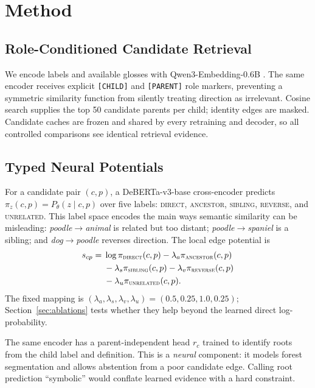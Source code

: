 \documentclass[11pt]{article}
\begin{document}
\section{Method}

\subsection{Role-Conditioned Candidate Retrieval}

We encode labels and available glosses with Qwen3-Embedding-0.6B
\citep{zhang2025qwen3embedding}.  The same encoder receives explicit
\texttt{[CHILD]} and \texttt{[PARENT]} role markers, preventing a symmetric
similarity function from silently treating direction as irrelevant.  Cosine
search supplies the top 50 candidate parents per child; identity edges are
masked.  Candidate caches are frozen and shared by every retraining and decoder, so
all controlled comparisons see identical retrieval evidence.

\subsection{Typed Neural Potentials}

For a candidate pair $(c,p)$, a DeBERTa-v3-base cross-encoder
\citep{he2021deberta} predicts $\pi_z(c,p)=P_\theta(z\mid c,p)$ over five
labels: \textsc{direct}, \textsc{ancestor}, \textsc{sibling},
\textsc{reverse}, and \textsc{unrelated}.
This label space encodes the main ways semantic similarity can be misleading:
\emph{poodle}$\rightarrow$\emph{animal} is related but too distant;
\emph{poodle}$\rightarrow$\emph{spaniel} is a sibling; and
\emph{dog}$\rightarrow$\emph{poodle} reverses direction.  The local edge
potential is
\begin{align}
s_{cp}={}&\log\pi_{\textsc{direct}}(c,p)
-\lambda_a\pi_{\textsc{ancestor}}(c,p)\nonumber\\
&-\lambda_s\pi_{\textsc{sibling}}(c,p)
-\lambda_v\pi_{\textsc{reverse}}(c,p)\nonumber\\
&-\lambda_u\pi_{\textsc{unrelated}}(c,p).
 \label{eq:potential}
\end{align}
The fixed mapping is
$(\lambda_a,\lambda_s,\lambda_v,\lambda_u)=(0.5,0.25,1.0,0.25)$; Section~\ref{sec:ablations}
tests whether they help beyond the learned direct log-probability.

The same encoder has a parent-independent head $r_c$ trained to identify roots
from the child label and definition.  This is a \emph{neural} component: it
models forest segmentation and allows abstention from a poor candidate edge.
Calling root prediction ``symbolic'' would conflate learned evidence with a
hard constraint.
\end{document}
